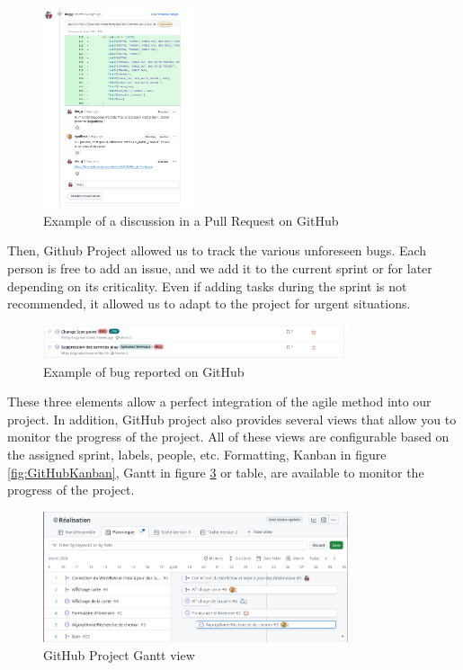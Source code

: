 \begin{figure}[H]
    \centering
    \includegraphics[width=0.4\textwidth]{img/GitHubDiscuss}
    \caption{Example of a discussion in a Pull Request on GitHub}
    \label{fig:GitHubPullRequest}
\end{figure}


Then, Github Project allowed us to track the various unforeseen bugs. Each person is free to add an issue, and we add it to the current sprint or for later depending on its criticality. Even if adding tasks during the sprint is not recommended, it allowed us to adapt to the project for urgent situations.


\begin{figure}[H]
    \centering
    \includegraphics[width=0.8\textwidth]{img/GitHubBug}
    \caption{Example of bug reported on GitHub}
    \label{fig:GitHubBug}
\end{figure}


These three elements allow a perfect integration of the agile method into our project. In addition, GitHub project also provides several views that allow you to monitor the progress of the project. All of these views are configurable based on the assigned sprint, labels, people, etc. Formatting, Kanban in figure \ref{fig:GitHubKanban}, Gantt in figure \ref{fig:GitHubGant} or table, are available to monitor the progress of the project.


\begin{figure}[H]
    \centering
    \includegraphics[width=0.8\textwidth]{img/GitHubGant}
    \caption{GitHub Project Gantt view}
    \label{fig:GitHubGant}
\end{figure}

